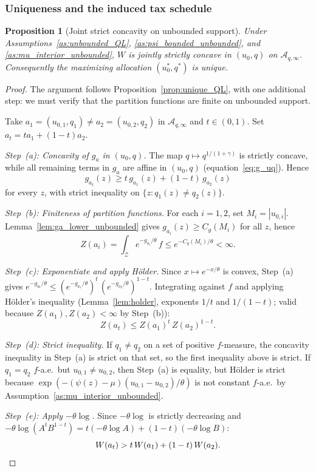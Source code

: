 \documentclass[12pt,a4paper]{article}
\theoremstyle{definition}
\theoremstyle{plain}
\newtheorem{proposition}{Proposition}[section]
\theoremstyle{remark}
\newcommand{\calZ}{\mathcal{Z}}
\begin{document}
\subsubsection{Uniqueness and the induced tax schedule}

\begin{proposition}[Joint strict concavity on unbounded support]
\label{prop:unique_unbounded}
Under Assumptions~\ref{as:unbounded_QL},
\ref{as:psi_bounded_unbounded}, and
\ref{as:mu_interior_unbounded}, $W$ is jointly strictly concave in
$(u_0,q)$ on $\mathcal{A}_{q,\infty}$.  Consequently the maximizing
allocation $(u_0^*,q^*)$ is unique.
\end{proposition}

\begin{proof}
The argument follows Proposition~\ref{prop:unique_QL}, with
one additional step: we must verify that the partition
functions are finite on unbounded support.

Take $a_1 = (u_{0,1},q_1) \neq a_2 = (u_{0,2},q_2)$ in
$\mathcal{A}_{q,\infty}$ and $t \in (0,1)$.  Set
$a_t = ta_1 + (1-t)a_2$.

\emph{Step~(a): Concavity of $g_a$ in $(u_0, q)$.}
The map $q \mapsto q^{1/(1+\gamma)}$ is strictly concave,
while all remaining terms in $g_a$ are affine in $(u_0,q)$
(equation~\eqref{eq:g_uq}).  Hence
\[
  g_{a_t}(z) \geq t\,g_{a_1}(z) + (1-t)\,g_{a_2}(z)
\]
for every $z$, with strict inequality on
$\{z : q_1(z) \neq q_2(z)\}$.

\emph{Step~(b): Finiteness of partition functions.}
For each $i = 1, 2$, set $M_i = |u_{0,i}|$.
Lemma~\ref{lem:ga_lower_unbounded} gives
$g_{a_i}(z) \geq C_g(M_i)$ for all $z$, hence
\[
  Z(a_i) = \int_\calZ e^{-g_{a_i}/\theta}\,f
  \leq e^{-C_g(M_i)/\theta} < \infty.
\]

\emph{Step~(c): Exponentiate and apply H\"older.}
Since $x \mapsto e^{-x/\theta}$ is convex, Step~(a) gives
$e^{-g_{a_t}/\theta}
\leq (e^{-g_{a_1}/\theta})^t\,(e^{-g_{a_2}/\theta})^{1-t}$.
Integrating against $f$ and applying H\"older's inequality
(Lemma~\ref{lem:holder}, exponents $1/t$ and $1/(1-t)$;
valid because $Z(a_1), Z(a_2) < \infty$ by Step~(b)):
\[
  Z(a_t) \leq Z(a_1)^t\,Z(a_2)^{1-t}.
\]

\emph{Step~(d): Strict inequality.}
If $q_1 \neq q_2$ on a set of positive $f$-measure, the
concavity inequality in Step~(a) is strict on that set, so
the first inequality above is strict.
If $q_1 = q_2$ $f$-a.e.\ but $u_{0,1} \neq u_{0,2}$, then
Step~(a) is equality, but H\"older is strict because
$\exp(-(\psi(z)-\mu)(u_{0,1}-u_{0,2})/\theta)$ is not
constant $f$-a.e.\ by
Assumption~\ref{as:mu_interior_unbounded}.

\emph{Step~(e): Apply $-\theta\log$.}
Since $-\theta\log$ is strictly decreasing and
$-\theta\log(A^t B^{1-t}) = t(-\theta\log A)
+ (1-t)(-\theta\log B)$:
\[
  W(a_t) > t\,W(a_1) + (1-t)\,W(a_2). \qedhere
\]
\end{proof}
\end{document}

